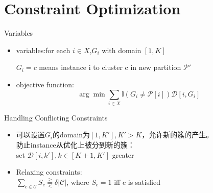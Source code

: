 \documentclass{beamer}
\begin{document}
\section{Constraint Optimization}

\begin{frame}{Variables}
\begin{itemize}
    \item 
variables:for each $ i\in X$,$G_i$ with domain $[1,K]$

$G_i=c$ means instance i  to cluster c in new partition $\mathcal{P}'$
\item objective function:
$$\arg\min\sum\limits_{i\in X} \mathbb{I}(G_i\neq\mathcal{P}[i])\mathcal{D}[i,G_i]$$

\end{itemize}

\end{frame}

\begin{frame}{Handling Conflicting Constraints}
\begin{itemize}
    \item 可以设置$G_i$的domain为$[1,K'],K'>K$，允许新的簇的产生。\\
    防止instance从优化上被分到新的簇：\\
    set $\mathcal{D}[i,k'],k\in [K+1,K']$ greater
    \item Relaxing constraints:\\
    $\sum\limits_{c\in\mathcal{C}}S_c \overset{>}{\underset{<}{=}} \delta |\mathcal{C}|$, where $S_c=1$ iff c is satisfied\\
\end{itemize}


\end{frame}
\end{document}
